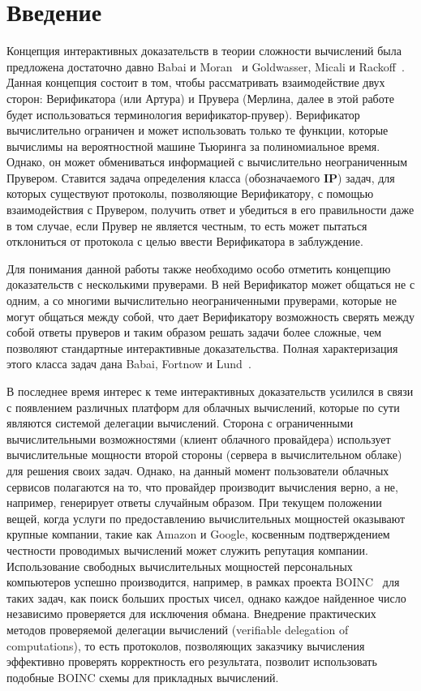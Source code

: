 \documentclass[14pt, a4paper]{extreport}
\begin{document}
\chapter*{Введение}
Концепция интерактивных доказательств в теории сложности вычислений была предложена достаточно давно Babai и Moran~\cite{babai1988arthur} и Goldwasser, Micali и Rackoff~\cite{goldwasser1989ip}. Данная концепция состоит в том, чтобы рассматривать взаимодействие двух сторон: Верификатора (или Артура) и Прувера (Мерлина, далее в этой работе будет использоваться терминология верификатор-прувер). Верификатор вычислительно ограничен и может использовать только те функции, которые вычислимы на вероятностной машине Тьюринга за полиномиальное время. Однако, он может обмениваться информацией с вычислительно неограниченным Прувером. Ставится задача определения класса (обозначаемого $\textbf{IP}$) задач, для которых существуют протоколы, позволяющие Верификатору, с помощью взаимодействия с Прувером, получить ответ и убедиться в его правильности даже в том случае, если Прувер не является честным, то есть может пытаться отклониться от протокола с целью ввести Верификатора в заблуждение.

Для понимания данной работы также необходимо особо отметить концепцию доказательств с несколькими пруверами. В ней Верификатор может общаться не с одним, а со многими вычислительно неограниченными пруверами, которые не могут общаться между собой, что дает Верификатору возможность сверять между собой ответы пруверов и таким образом решать задачи более сложные, чем позволяют стандартные интерактивные доказательства. Полная характеризация этого класса задач дана Babai, Fortnow и Lund~\cite{babai1991mip}.

В последнее время интерес к теме интерактивных доказательств усилился в связи с появлением различных платформ для облачных вычислений, которые по сути являются системой делегации вычислений. Сторона с ограниченными вычислительными возможностями (клиент облачного провайдера) использует вычислительные мощности второй стороны (сервера в вычислительном облаке) для решения своих задач. Однако, на данный момент пользователи облачных сервисов полагаются на то, что провайдер производит вычисления верно, а не, например, генерирует ответы случайным образом. При текущем положении вещей, когда услуги по предоставлению вычислительных мощностей оказывают крупные компании, такие как Amazon и Google, косвенным подтверждением честности проводимых вычислений может служить репутация компании. Использование свободных вычислительных мощностей персональных компьютеров успешно производится, например, в рамках проекта BOINC~\cite{anderson2004boinc} для таких задач, как поиск больших простых чисел, однако каждое найденное число независимо проверяется для исключения обмана. Внедрение практических методов проверяемой делегации вычислений (verifiable delegation of computations), то есть протоколов, позволяющих заказчику вычисления эффективно проверять корректность его результата, позволит использовать подобные BOINC схемы для прикладных вычислений.
\end{document}
